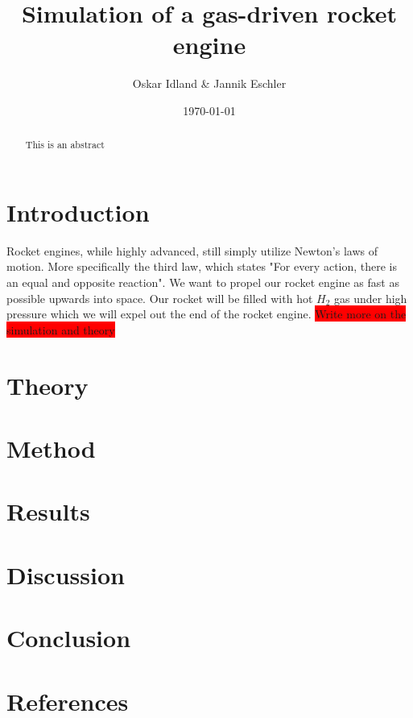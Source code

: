 \documentclass[reprint,english,notitlepage]{revtex4-2}
\begin{document}
\title{Simulation of a gas-driven rocket engine}
\author{Oskar Idland \& Jannik Eschler}
\date{\today}

\begin{abstract}
This is an abstract
\end{abstract}
\maketitle

\section{Introduction}
	Rocket engines, while highly advanced, still simply utilize Newton's laws of motion. More specifically the third law, which states "For every action, there is an equal and opposite reaction". We want to propel our rocket engine as fast as possible upwards into space.
	Our rocket will be filled with hot $ H_2 $ gas under high pressure which we will expel out the end of the rocket engine. \colorbox{red}{Write more on the simulation and theory}
\section{Theory}
\section{Method}
\section{Results}
\section{Discussion}
\section{Conclusion}
\section{References}
\end{document}
